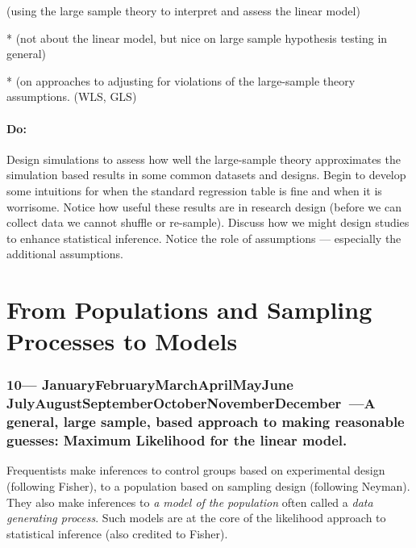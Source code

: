 \documentclass[10pt]{article}
\def\themonth{\ifcase\month\or
  January\or February\or March\or April\or May\or June\or
  July\or August\or September\or October\or November\or December\fi}
\begin{document}
\citealp{achen82}

\citealp[Chapter 4,6]{berk04}

\citealp[Chap 7]{gelman2007dau} (using the large sample theory to
interpret and assess the linear model)

*\citealp[Chap 9]{trosset2009isi} (not about the linear model, but nice
on large sample hypothesis testing in general)

*\citealp[Chap 12]{fox2008applied} (on approaches to adjusting for
violations of the large-sample theory assumptions. (WLS, GLS)

\subsection{Do:} Design simulations to assess how well the
large-sample theory approximates the simulation based results in some
common datasets and designs. Begin to develop some intuitions for when
the standard regression table is fine and when it is worrisome. Notice
how useful these results are in research design (before we can collect
data we cannot shuffle or re-sample). Discuss how we might design
studies to enhance statistical inference. Notice the role of
assumptions --- especially the additional assumptions.



\part{From Populations and Sampling Processes to Models} %

\AdvanceDate[7]
\section{10---\themonth~\the\day---A general, large sample, based approach to
  making reasonable guesses: Maximum Likelihood for the linear model.}

Frequentists make inferences to control groups based on experimental
design (following Fisher), to a population based on sampling design
(following Neyman). They also make inferences to \emph{a model of the
  population} often called a \emph{data generating process}. Such
models are at the core of the likelihood approach to statistical
inference (also credited to Fisher).
\end{document}
